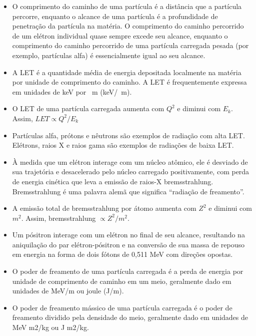 \documentclass[11pt,a4paper]{article}
\newcounter{exemplo}
\begin{document}
\begin{exemplo}
\begin{itemize}
        \item O comprimento do caminho de uma partícula é a distância que a partícula percorre, enquanto o alcance de uma partícula é a profundidade de penetração da partícula na matéria. O comprimento do caminho percorrido de um elétron individual quase sempre excede seu alcance, enquanto o comprimento do caminho percorrido de uma partícula carregada pesada (por exemplo, partículas alfa) é essencialmente igual ao seu alcance.
        
        \item A LET é a quantidade média de energia depositada localmente na matéria por unidade de comprimento do caminho. A LET é frequentemente expressa em unidades de keV por \unit{\mu m} (\unit{keV/\mu m}).
        
        \item O LET de uma partícula carregada aumenta com $Q^2$ e diminui com $E_k$. Assim, $LET \propto Q^2/E_k$
        
        \item Partículas alfa, prótons e nêutrons são exemplos de radiação com alta LET. Elétrons, raios X e raios gama são exemplos de radiações de baixa LET.
        
        \item À medida que um elétron interage com um núcleo atômico, ele é desviado de sua trajetória e desacelerado pelo núcleo carregado positivamente, com perda de energia cinética que leva a emissão de raios-X bremsstrahlung. Bremsstrahlung é uma palavra alemã que significa ``radiação de freamento''.
        
        \item A emissão total de bremsstrahlung por átomo aumenta com $Z^2$ e diminui com $m^2$. Assim, bremsstrahlung $\propto Z^2/m^2$.
        
        \item Um pósitron interage com um elétron no final de seu alcance, resultando na aniquilação do par elétron-pósitron e na conversão de sua massa de repouso em energia na forma de dois fótons de 0,511 MeV com direções opostas.
        
        \item O poder de freamento de uma partícula carregada é a perda de energia por unidade de comprimento de caminho em um meio, geralmente dado em unidades de MeV/m ou joule (J/m).
        
        \item O poder de freamento mássico de uma partícula carregada é o poder de freamento dividido pela densidade do meio, geralmente dado em unidades de MeV m2/kg ou J m2/kg.
        

\end{itemize}
\end{exemplo}
\end{document}
